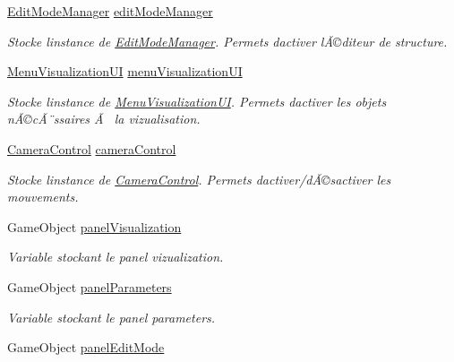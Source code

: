 \begin{DoxyCompactItemize}
\item 
\mbox{\hyperlink{class_edit_mode_manager}{Edit\+Mode\+Manager}} \mbox{\hyperlink{class_navigation_a59344933bd9a22b16612407dee4e8aa5}{edit\+Mode\+Manager}}
\begin{DoxyCompactList}\small\item\em Stocke l\textquotesingle{}instance de \mbox{\hyperlink{class_edit_mode_manager}{Edit\+Mode\+Manager}}. Permets d\textquotesingle{}activer l\textquotesingle{}Ã©diteur de structure. \end{DoxyCompactList}\item 
\mbox{\hyperlink{class_menu_visualization_u_i}{Menu\+Visualization\+UI}} \mbox{\hyperlink{class_navigation_affdf26928cacf9c7582cb21ff6bf85dd}{menu\+Visualization\+UI}}
\begin{DoxyCompactList}\small\item\em Stocke l\textquotesingle{}instance de \mbox{\hyperlink{class_menu_visualization_u_i}{Menu\+Visualization\+UI}}. Permets d\textquotesingle{}activer les objets nÃ©cÃ¨ssaires Ã  la vizualisation. \end{DoxyCompactList}\item 
\mbox{\hyperlink{class_camera_control}{Camera\+Control}} \mbox{\hyperlink{class_navigation_a8ee62aef67edcc54d1478d20c22fff12}{camera\+Control}}
\begin{DoxyCompactList}\small\item\em Stocke l\textquotesingle{}instance de \mbox{\hyperlink{class_camera_control}{Camera\+Control}}. Permets d\textquotesingle{}activer/dÃ©sactiver les mouvements. \end{DoxyCompactList}\item 
Game\+Object \mbox{\hyperlink{class_navigation_a87c0235e826c5cd805b95b81c8c55ceb}{panel\+Visualization}}
\begin{DoxyCompactList}\small\item\em Variable stockant le panel vizualization. \end{DoxyCompactList}\item 
Game\+Object \mbox{\hyperlink{class_navigation_ae85a69c809b880b39ac4cb86f2d80258}{panel\+Parameters}}
\begin{DoxyCompactList}\small\item\em Variable stockant le panel parameters. \end{DoxyCompactList}\item 
Game\+Object \mbox{\hyperlink{class_navigation_aa095d3e8d992350e8452f4c91ca607c9}{panel\+Edit\+Mode}}

\end{DoxyCompactItemize}
